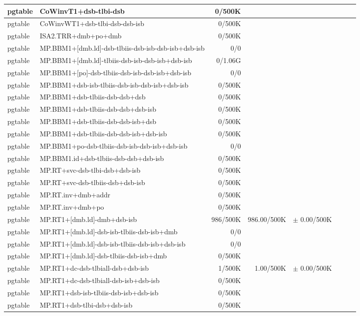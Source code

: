 \begin{tabular}{l l  | r r l | r r l}
\hline
   pgtable&CoWinvT1+dsb-tlbi-dsb&0/500K&&&\\
\hline
   pgtable&CoWinvWT1+dsb-tlbi-dsb-dsb-isb&0/500K&&&\\
\hline
   pgtable&ISA2.TRR+dmb+po+dmb&0/500K&&&\\
\hline
   pgtable&MP.BBM1+[dmb.ld]-dsb-tlbiis-dsb-isb-dsb-isb+dsb-isb&0/0&&&\\
\hline
   pgtable&MP.BBM1+[dmb.ld]-tlbiis-dsb-isb-dsb-isb+dsb-isb&0/1.06G&&&\\
\hline
   pgtable&MP.BBM1+[po]-dsb-tlbiis-dsb-isb-dsb-isb+dsb-isb&0/0&&&\\
\hline
   pgtable&MP.BBM1+dsb-isb-tlbiis-dsb-isb-dsb-isb+dsb-isb&0/500K&&&\\
\hline
   pgtable&MP.BBM1+dsb-tlbiis-dsb-dsb+dsb&0/500K&&&\\
\hline
   pgtable&MP.BBM1+dsb-tlbiis-dsb-dsb+dsb-isb&0/500K&&&\\
\hline
   pgtable&MP.BBM1+dsb-tlbiis-dsb-dsb-isb+dsb&0/500K&&&\\
\hline
   pgtable&MP.BBM1+dsb-tlbiis-dsb-dsb-isb+dsb-isb&0/500K&&&\\
\hline
   pgtable&MP.BBM1+po-dsb-tlbiis-dsb-isb-dsb-isb+dsb-isb&0/0&&&\\
\hline
   pgtable&MP.BBM1.id+dsb-tlbiis-dsb-dsb+dsb-isb&0/500K&&&\\
\hline
   pgtable&MP.RT+svc-dsb-tlbi-dsb+dsb-isb&0/500K&&&\\
\hline
   pgtable&MP.RT+svc-dsb-tlbiis-dsb+dsb-isb&0/500K&&&\\
\hline
   pgtable&MP.RT.inv+dmb+addr&0/500K&&&\\
\hline
   pgtable&MP.RT.inv+dmb+po&0/500K&&&\\
\hline
   pgtable&MP.RT1+[dmb.ld]-dmb+dsb-isb&986/500K&986.00/500K&$\pm$ 0.00/500K&\\
\hline
   pgtable&MP.RT1+[dmb.ld]-dsb-isb-tlbiis-dsb-isb+dmb&0/0&&&\\
\hline
   pgtable&MP.RT1+[dmb.ld]-dsb-isb-tlbiis-dsb-isb+dsb-isb&0/0&&&\\
\hline
   pgtable&MP.RT1+[dmb.ld]-dsb-tlbiis-dsb-isb+dmb&0/500K&&&\\
\hline
   pgtable&MP.RT1+dc-dsb-tlbiall-dsb+dsb-isb&1/500K&1.00/500K&$\pm$ 0.00/500K&\\
\hline
   pgtable&MP.RT1+dc-dsb-tlbiall-dsb-isb+dsb-isb&0/500K&&&\\
\hline
   pgtable&MP.RT1+dsb-isb-tlbiis-dsb-isb+dsb-isb&0/500K&&&\\
\hline
   pgtable&MP.RT1+dsb-tlbi-dsb+dsb-isb&0/500K&&&\\

\end{tabular}
